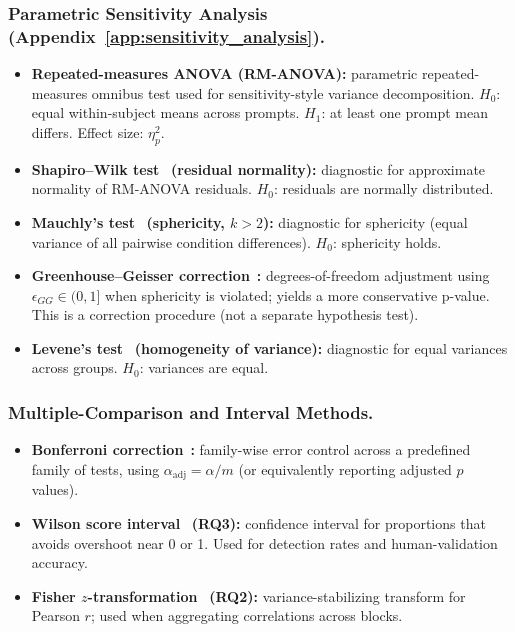 \subsubsection{Parametric Sensitivity Analysis (Appendix~\ref{app:sensitivity_analysis}).}
\begin{itemize}[noitemsep]
    \item \textbf{Repeated-measures ANOVA (RM-ANOVA):} parametric repeated-measures omnibus test used for sensitivity-style variance decomposition. $H_0$: equal within-subject means across prompts. $H_1$: at least one prompt mean differs. Effect size: $\eta^2_p$.
    \item \textbf{Shapiro--Wilk test}~\cite{shapiro1965analysis} \textbf{(residual normality):} diagnostic for approximate normality of RM-ANOVA residuals. $H_0$: residuals are normally distributed.
    \item \textbf{Mauchly's test}~\cite{mauchly1940significance} \textbf{(sphericity, $k>2$):} diagnostic for sphericity (equal variance of all pairwise condition differences). $H_0$: sphericity holds.
    \item \textbf{Greenhouse--Geisser correction}~\cite{greenhouse1959methods}\textbf{:} degrees-of-freedom adjustment using $\epsilon_{GG}\in(0,1]$ when sphericity is violated; yields a more conservative p-value. This is a correction procedure (not a separate hypothesis test).
    \item \textbf{Levene's test}~\cite{levene1960robust} \textbf{(homogeneity of variance):} diagnostic for equal variances across groups. $H_0$: variances are equal.
\end{itemize}

\subsubsection{Multiple-Comparison and Interval Methods.}
\begin{itemize}[noitemsep]
    \item \textbf{Bonferroni correction}~\cite{bonferroni1936teoria,dunn1961multiple}\textbf{:} family-wise error control across a predefined family of tests, using $\alpha_{\text{adj}}=\alpha/m$ (or equivalently reporting adjusted $p$ values).
    \item \textbf{Wilson score interval}~\cite{wilson1927probable} \textbf{(RQ3):} confidence interval for proportions that avoids overshoot near 0 or 1. Used for detection rates and human-validation accuracy.
    \item \textbf{Fisher $z$-transformation}~\cite{fisher1915frequency} \textbf{(RQ2):} variance-stabilizing transform for Pearson $r$; used when aggregating correlations across blocks.
\end{itemize}

